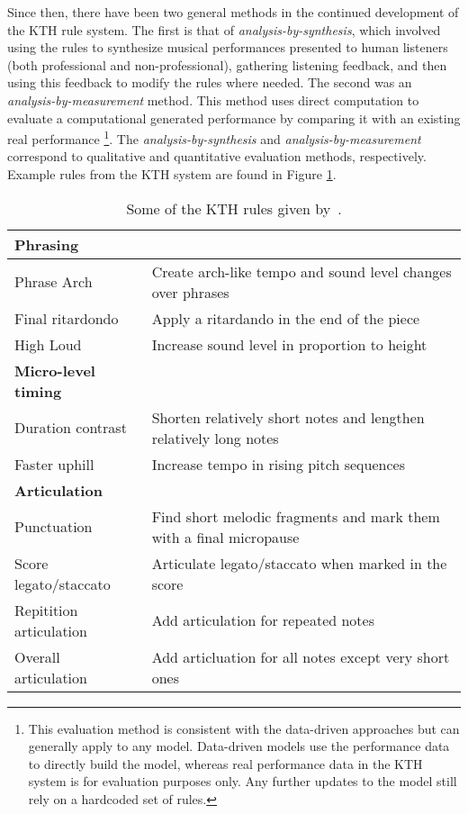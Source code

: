 Since then, there have been two general methods in the continued development of the KTH rule system. The first is that of \emph{analysis-by-synthesis}, which involved using the rules to synthesize musical performances presented to human listeners (both professional and non-professional), gathering listening feedback, and then using this feedback to modify the rules where needed. The second was an \emph{analysis-by-measurement} method. This method uses direct computation to evaluate a computational generated performance by comparing it with an existing real performance%
\footnote{This evaluation method is consistent with the data-driven approaches but can generally apply to any model. Data-driven models use the performance data to directly build the model, whereas real performance data in the KTH system is for evaluation purposes only. Any further updates to the model still rely on a hardcoded set of rules.}. The \emph{analysis-by-synthesis} and \emph{analysis-by-measurement} correspond to qualitative and quantitative evaluation methods, respectively. Example rules from the KTH system are found in Figure \ref{tab:kth-rules}.


\begin{table}
    \setlength{\extrarowheight}{7pt}
    \begin{center}
    \begin{tabular}{l | l }
        \textbf{Phrasing} & \\
        \hline
        Phrase Arch & Create arch-like tempo and sound level changes over phrases \\
        Final ritardondo & Apply a ritardando in the end of the piece \\
        High Loud & Increase sound level in proportion to height \\
        \textbf{Micro-level timing} & \\
        \hline
        Duration contrast & Shorten relatively short notes and lengthen relatively long notes \\ 
        Faster uphill & Increase tempo in rising pitch sequences \\
        \textbf{Articulation} & \\
        \hline
        Punctuation & Find short melodic fragments and mark them with a final micropause \\
        Score legato/staccato & Articulate legato/staccato when marked in the score \\
        Repitition articulation & Add articulation for repeated notes \\
        Overall articulation & Add articluation for all notes except very short ones 
    \end{tabular}
    \caption{Some of the KTH rules given by~\citet{friberg2006overview}.}
    \label{tab:kth-rules}
    \end{center}
\end{table}


